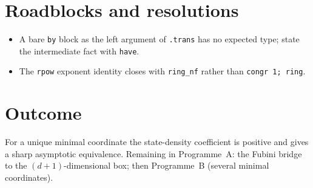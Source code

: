 \documentclass[11pt]{article}
\begin{document}
\section{Roadblocks and resolutions}
\begin{itemize}
\item A bare \texttt{by} block as the left argument of \texttt{.trans} has no expected type; state
the intermediate fact with \texttt{have}.
\item The \texttt{rpow} exponent identity closes with \texttt{ring\_nf} rather than \texttt{congr 1; ring}.
\end{itemize}

\section{Outcome}
For a unique minimal coordinate the state-density coefficient is positive and gives a sharp asymptotic
equivalence. Remaining in Programme~A: the Fubini bridge to the $(d+1)$-dimensional box; then Programme~B
(several minimal coordinates).
\end{document}
